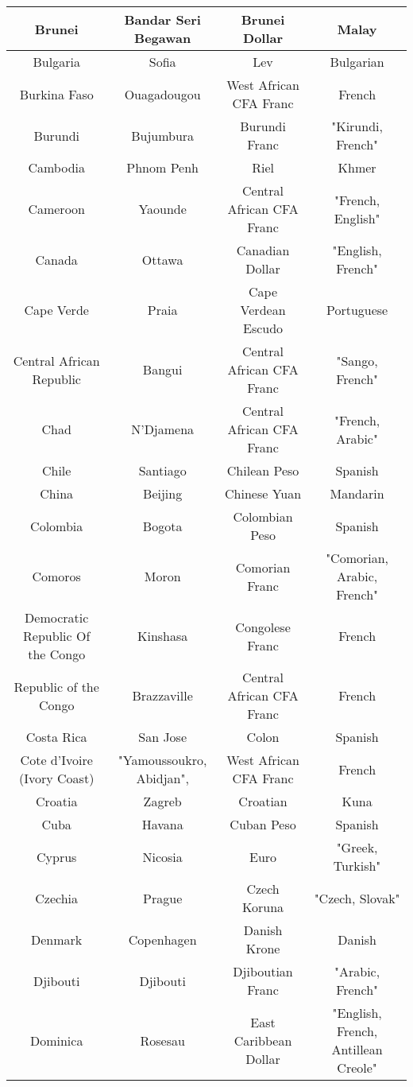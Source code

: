 \documentclass{article}
\begin{document}
\begin{center}
\begin{tabular} {||  c c c c  ||}
Brunei & Bandar Seri Begawan & Brunei Dollar & Malay   \\ \hline 
Bulgaria & Sofia & Lev & Bulgarian   \\ \hline 
Burkina Faso & Ouagadougou & West African CFA Franc & French   \\ \hline 
Burundi & Bujumbura & Burundi Franc & "Kirundi, French"   \\ \hline 
Cambodia & Phnom Penh & Riel & Khmer   \\ \hline 
Cameroon & Yaounde & Central African CFA Franc & "French, English"   \\ \hline 
Canada & Ottawa & Canadian Dollar & "English, French"   \\ \hline 
Cape Verde & Praia & Cape Verdean Escudo & Portuguese   \\ \hline 
Central African Republic & Bangui & Central African CFA Franc & "Sango, French"   \\ \hline 
Chad & N'Djamena & Central African CFA Franc & "French, Arabic"   \\ \hline 
Chile & Santiago & Chilean Peso & Spanish   \\ \hline 
China & Beijing & Chinese Yuan & Mandarin   \\ \hline 
Colombia & Bogota & Colombian Peso & Spanish   \\ \hline 
Comoros & Moron & Comorian Franc & "Comorian, Arabic, French"   \\ \hline 
Democratic Republic Of the Congo & Kinshasa & Congolese Franc & French   \\ \hline 
Republic of the Congo & Brazzaville & Central African CFA Franc & French   \\ \hline 
Costa Rica & San Jose & Colon & Spanish   \\ \hline 
Cote d'Ivoire (Ivory Coast) & "Yamoussoukro, Abidjan", & West African CFA Franc & French   \\ \hline 
Croatia & Zagreb & Croatian & Kuna   \\ \hline 
Cuba & Havana & Cuban Peso & Spanish   \\ \hline 
Cyprus & Nicosia & Euro & "Greek, Turkish"   \\ \hline 
Czechia & Prague & Czech Koruna & "Czech, Slovak"   \\ \hline 
Denmark & Copenhagen & Danish Krone & Danish   \\ \hline 
Djibouti & Djibouti & Djiboutian Franc & "Arabic, French"   \\ \hline 
Dominica & Rosesau & East Caribbean Dollar & "English, French, Antillean Creole"   \\ \hline 

\end{tabular}
\end{center}
\end{document}
